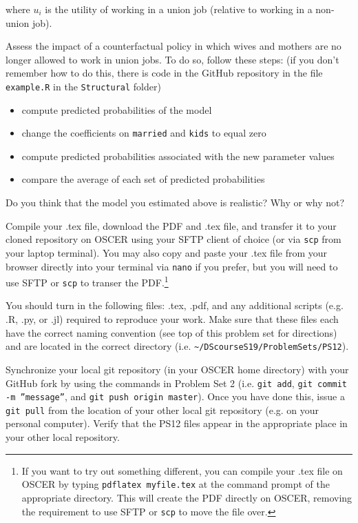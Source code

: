 \documentclass[12pt,english]{exam}
\begin{document}
\begin{questions}
where $u_{i}$ is the utility of working in a union job (relative to working in a non-union job).

\question Assess the impact of a counterfactual policy in which wives and mothers are no longer allowed to work in union jobs. To do so, follow these steps: (if you don't remember how to do this, there is code in the GitHub repository in the file \texttt{example.R} in the \texttt{Structural} folder)
\begin{itemize}
    \item compute predicted probabilities of the model
    \item change the coefficients on \texttt{married} and \texttt{kids} to equal zero
    \item compute predicted probabilities associated with the new parameter values
    \item compare the average of each set of predicted probabilities
\end{itemize}

Do you think that the model you estimated above is realistic? Why or why not?

\question Compile your .tex file, download the PDF and .tex file, and transfer it to your cloned repository on OSCER using your SFTP client of choice (or via \texttt{scp} from your laptop terminal). You may also copy and paste your .tex file from your browser directly into your terminal via \texttt{nano} if you prefer, but you will need to use SFTP or \texttt{scp} to transer the PDF.\footnote{If you want to try out something different, you can compile your .tex file on OSCER by typing \texttt{pdflatex myfile.tex} at the command prompt of the appropriate directory. This will create the PDF directly on OSCER, removing the requirement to use SFTP or \texttt{scp} to move the file over.}

\question You should turn in the following files: .tex, .pdf, and any additional scripts (e.g. .R, .py, or .jl) required to reproduce your work.  Make sure that these files each have the correct naming convention (see top of this problem set for directions) and are located in the correct directory (i.e. \texttt{\textasciitilde/DScourseS19/ProblemSets/PS12}).

\question Synchronize your local git repository (in your OSCER home directory) with your GitHub fork by using the commands in Problem Set 2 (i.e. \texttt{git add}, \texttt{git commit -m ''message''}, and \texttt{git push origin master}). Once you have done this, issue a \texttt{git pull} from the location of your other local git repository (e.g. on your personal computer). Verify that the PS12 files appear in the appropriate place in your other local repository.

\end{questions}
\end{document}
